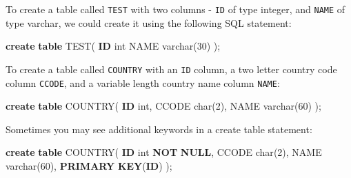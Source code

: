 \documentclass[
]{book}
\newenvironment{Shaded}{\begin{snugshade}}{\end{snugshade}}
\newcommand{\DataTypeTok}[1]{\textcolor[rgb]{0.13,0.29,0.53}{#1}}
\newcommand{\DecValTok}[1]{\textcolor[rgb]{0.00,0.00,0.81}{#1}}
\newcommand{\KeywordTok}[1]{\textcolor[rgb]{0.13,0.29,0.53}{\textbf{#1}}}
\newcommand{\NormalTok}[1]{#1}
\begin{document}
To create a table called \texttt{TEST} with two columns - \texttt{ID} of type integer, and \texttt{NAME} of type varchar, we could create it using the following SQL statement:

\begin{Shaded}
\begin{Highlighting}[]
\KeywordTok{create} \KeywordTok{table}\NormalTok{ TEST(}
  \KeywordTok{ID} \DataTypeTok{int}
\NormalTok{  NAME }\DataTypeTok{varchar}\NormalTok{(}\DecValTok{30}\NormalTok{)}
\NormalTok{);}
\end{Highlighting}
\end{Shaded}

To create a table called \texttt{COUNTRY} with an \texttt{ID} column, a two letter country code column \texttt{CCODE}, and a variable length country name column \texttt{NAME}:

\begin{Shaded}
\begin{Highlighting}[]
\KeywordTok{create} \KeywordTok{table}\NormalTok{ COUNTRY(}
    \KeywordTok{ID} \DataTypeTok{int}\NormalTok{,}
\NormalTok{    CCODE }\DataTypeTok{char}\NormalTok{(}\DecValTok{2}\NormalTok{),}
\NormalTok{    NAME }\DataTypeTok{varchar}\NormalTok{(}\DecValTok{60}\NormalTok{)}
\NormalTok{);}
\end{Highlighting}
\end{Shaded}

Sometimes you may see additional keywords in a create table statement:

\begin{Shaded}
\begin{Highlighting}[]
\KeywordTok{create} \KeywordTok{table}\NormalTok{ COUNTRY(}
    \KeywordTok{ID} \DataTypeTok{int} \KeywordTok{NOT} \KeywordTok{NULL}\NormalTok{,}
\NormalTok{    CCODE }\DataTypeTok{char}\NormalTok{(}\DecValTok{2}\NormalTok{),}
\NormalTok{    NAME }\DataTypeTok{varchar}\NormalTok{(}\DecValTok{60}\NormalTok{),}
    \KeywordTok{PRIMARY} \KeywordTok{KEY}\NormalTok{(}\KeywordTok{ID}\NormalTok{)}
\NormalTok{);}
\end{Highlighting}
\end{Shaded}
\end{document}
